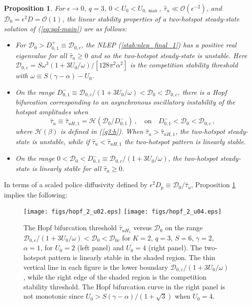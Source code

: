 \documentclass{article}%
\newtheorem{prop}[theorem]{Proposition}
\begin{document}
\begin{prop}\label{q3:main_twospots} For $\epsilon\to 0$, 
$q=3$, $0<U_0<U_{0,\max}$, $\hat{\tau}_u\ll {\mathcal
    O}(\epsilon^{-2})$, and ${\mathcal D}_0=\epsilon^2 D = {\mathcal
    O}(1)$, the linear stability properties of a two-hotspot
  steady-state solution of (\ref{eq:pol-main}) are as follows:
\begin{itemize}
  \item For ${\mathcal D}_0>D^{+}_{0,1}\equiv {\mathcal D}_{0,c}$, the
    NLEP (\ref{stab:nlep_final_1}) has a positive real eigenvalue for
    all $\hat{\tau}_u\geq 0$ and so the two-hotspot steady-state is
    unstable. Here ${\mathcal D}_{0,c}={S\omega^3
      \left(1+{3U_0/\omega}\right)/[128\pi^2\alpha^2]}$ is the
    competition stability threshold with $\omega\equiv
    S(\gamma-\alpha)-U_0$.
 \item On the range $D^{-}_{0,1} \equiv {{\mathcal
      D}_{0,c}/\left(1+{3U_0/\omega}\right)} < {\mathcal D}_0
    <{\mathcal D}_{0,c}$, there is a Hopf bifurcation corresponding to an
   asynchronous oscillatory instability of the hotspot
    amplitudes when 
\begin{equation}\label{q3:2osc}
 \hat{\tau}_{u}\equiv \hat{\tau}_{uH,1}= {\mathcal H}\left({{\mathcal
     D}_0/D^{-}_{0,1}}\right) \,, \quad \mbox{on} \quad
 D^{-}_{0,1}<{\mathcal D}_0 <{\mathcal D}_{0,c} \,,
\end{equation}
where ${\mathcal H}(\beta)$ is defined in (\ref{q3:h}).  When
$\hat{\tau}_u>\hat{\tau}_{uH,1}$, the two-hotspot steady-state is
unstable, while if $\hat{\tau}_u<\hat{\tau}_{uH,1}$ the two-hotspot
pattern is linearly stable.
\item On the range $0<{\mathcal D}_0 < D^{-}_{0,1} \equiv {{\mathcal
    D}_{0,c}/\left(1+{3U_0/\omega}\right)}$, the two-hotspot
  steady-state is linearly stable for all $\hat{\tau}_u\geq 0$.
\end{itemize}
\end{prop}

\noindent In terms of a scaled police diffusivity defined by 
$\epsilon^2 D_p\equiv {{\mathcal D}_0/\hat{\tau}_u}$, Proposition
\ref{q3:main_twospots} implies the following:

\begin{figure}[htbp]
\centering
\texttt{[image: figs/hopf\_2\_u02.eps]}
\texttt{[image: figs/hopf\_2\_u04.eps]}
\caption{\label{fig:hopf_tau_2} The Hopf bifurcation threshold
  $\hat{\tau}_{uH_1}$ versus ${\mathcal D}_0$ on the range ${{\mathcal
      D}_{0,c}/(1+{3U_0/\omega})}<{\mathcal D}_0<{\mathcal D}_{0c}$
  for $K=2$, $q=3$, $S=6$, $\gamma=2$, $\alpha=1$, for $U_0=2$
  (left panel) and $U_0=4$ (right panel). The two-hotspot pattern is
  linearly stable in the shaded region. The thin
  vertical line in each figure is the lower boundary ${{\mathcal
      D}_{0,c}/(1+{3U_0/\omega})}$, while the right edge of the shaded
  region is the competition stability threshold.  The Hopf bifurcation
  curve in the right panel is not monotonic since
  $U_0>{S(\gamma-\alpha)/(1+\sqrt{3})}$ when $U_0=4$.}
\end{figure}
\end{document}
